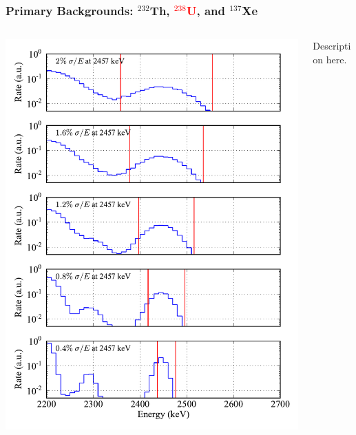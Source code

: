 \documentclass{beamer}
\begin{document}
\begin{frame}
\begin{center}
\frametitle{Primary Backgrounds: $^{232}$Th, \textcolor{red}{$^{238}$U}, and $^{137}$Xe}
\end{center}
\begin{columns}
\begin{column}{.6\textwidth}
\includegraphics[keepaspectratio=true,width=\textwidth]{U_Spectra_vs_Res.pdf}
\end{column}
\begin{column}{.4\textwidth}
Description here.
\end{column}
\end{columns}
\end{frame}
\end{document}
